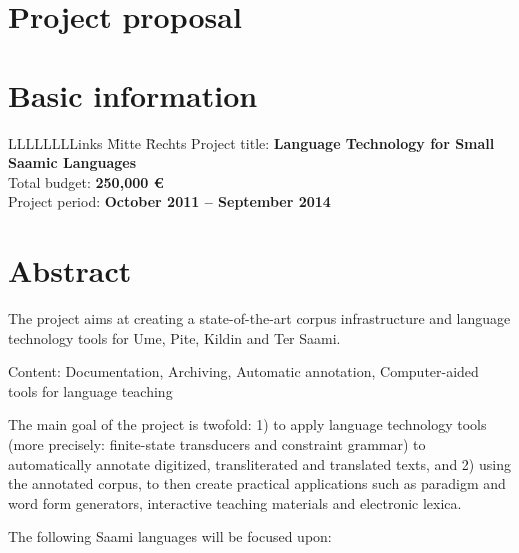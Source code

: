 \documentclass[a4paper,12pt]{article}
\begin{document}
\newpage

\section*{Project proposal}

\section{Basic information}

\begin{tabbing}
LLLLLLLLinks \= Mitte \= Rechts \kill
Project title: \>\textbf{Language Technology for Small Saamic Languages}\\
Total budget: \>\textbf{250,000 €}\\
Project period: \>\textbf{October 2011 – September 2014}\\
\end{tabbing}

\section{Abstract}%

The project aims at creating a state-of-the-art corpus infrastructure and language technology tools for Ume, Pite, Kildin and Ter Saami.

Content: Documentation, Archiving, Automatic annotation, Computer-aided tools for language teaching

The main goal of the project is twofold: 1) to apply language technology tools (more precisely: finite-state transducers and constraint grammar) to automatically annotate digitized, transliterated and translated texts, and 2) using the annotated corpus, to then create practical applications such as paradigm and word form generators, interactive teaching materials and electronic lexica.

The following Saami languages will be focused upon:
\end{document}

